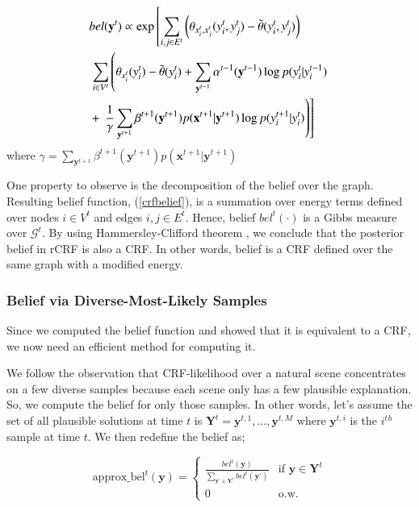 \begin{equation}\small
  \begin{aligned}
&bel(\mathbf{y}^t) \propto \exp\left[  \sum_{i,j \in E^t} \left( \theta_{x^t_i,x^t_j}(y^t_i,y^t_j) - \tilde{\theta}(y^t_i,y^t_j) \right) \right. \\
&\left. \sum_{i \in V^t} \left( \theta_{x^t_i}(y^t_i) - \tilde{\theta}(y^t_i) +  \sum_{\mathbf{y}^{t-1}} \alpha^{t-1}(\mathbf{y}^{t-1}) \log p(y^t_i|y^{t-1}_i) \right. \right. \\
&+\left.\left.\frac{1}{\gamma}\sum_{\mathbf{y}^{t+1}} \beta^{t+1}(\mathbf{y}^{t+1}) p(\mathbf{x}^{t+1}|\mathbf{y}^{t+1}) \log p(y^{t+1}_i|y^{t}_i) \right) \right]
\end{aligned}
\label{crfbelief}
\end{equation}
where $\gamma=\sum_{\mathbf{y}^{t+1}} \beta^{t+1}(\mathbf{y}^{t+1}) p(\mathbf{x}^{t+1}|\mathbf{y}^{t+1})$

One property to observe is the decomposition of the belief over the graph. Resulting belief function, (\ref{crfbelief}), is a summation over energy terms defined over nodes $i \in V^t$ and edges $i,j\in E^t$. Hence, belief $bel^t(\cdot)$ is a Gibbs measure over $\mathcal{G}^t$. By using Hammersley-Clifford theorem \cite{hc1971}, we  conclude that the posterior belief in rCRF is also a CRF. In other words, belief is a CRF defined over the same graph with a modified energy.

\subsubsection{Belief via Diverse-Most-Likely Samples}
\label{divm}
Since we computed the belief function and showed that it is equivalent to a CRF, we now need
an efficient method for computing it.


We follow the observation that CRF-likelihood over a natural scene concentrates on a few diverse samples \cite{divmbest} because each scene only has a few plausible explanation. So, we compute the belief for only those samples. In other words, let's assume the set of all plausible solutions at time $t$ is $\mathbf{Y}^t={\mathbf{y}^{t,1},\ldots,\mathbf{y}^{t,M}}$ where $\mathbf{y}^{t,i}$ is the $i^{th}$ sample at time $t$. We then redefine the belief as;

\begin{equation}
	\text{approx\_bel}^t(\mathbf{y})=\left\{ \begin{array}{cc} \frac{bel^t(\mathbf{y})}{\sum_{\mathbf{y}^\prime \in \mathbf{Y}^t} bel^t(\mathbf{y}^\prime)} & \text{if $\mathbf{y} \in \mathbf{Y}^t$} \\ 0 & \text{o.w.} \end{array} \right.
\end{equation}

